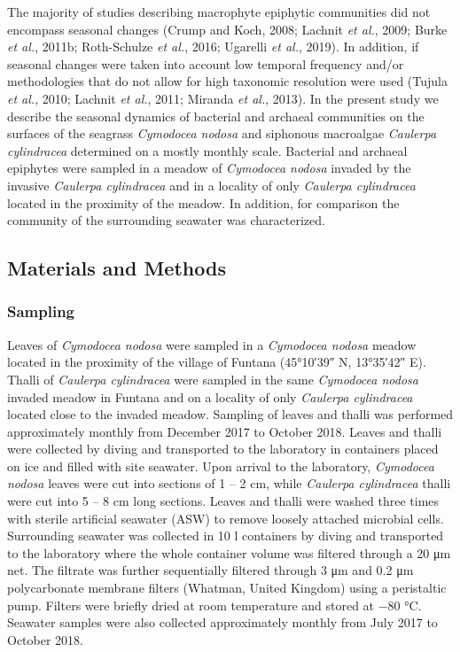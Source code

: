 \documentclass[12pt,]{article}
\begin{document}
The majority of studies describing macrophyte epiphytic communities did
not encompass seasonal changes (Crump and Koch, 2008; Lachnit \emph{et
al.}, 2009; Burke \emph{et al.}, 2011b; Roth-Schulze \emph{et al.},
2016; Ugarelli \emph{et al.}, 2019). In addition, if seasonal changes
were taken into account low temporal frequency and/or methodologies that
do not allow for high taxonomic resolution were used (Tujula \emph{et
al.}, 2010; Lachnit \emph{et al.}, 2011; Miranda \emph{et al.}, 2013).
In the present study we describe the seasonal dynamics of bacterial and
archaeal communities on the surfaces of the seagrass \emph{Cymodocea
nodosa} and siphonous macroalgae \emph{Caulerpa cylindracea} determined
on a mostly monthly scale. Bacterial and archaeal epiphytes were sampled
in a meadow of \emph{Cymodocea nodosa} invaded by the invasive
\emph{Caulerpa cylindracea} and in a locality of only \emph{Caulerpa
cylindracea} located in the proximity of the meadow. In addition, for
comparison the community of the surrounding seawater was characterized.

\newpage

\hypertarget{materials-and-methods}{%
\subsection{Materials and Methods}\label{materials-and-methods}}

\hypertarget{sampling}{%
\subsubsection{Sampling}\label{sampling}}

Leaves of \emph{Cymodocea nodosa} were sampled in a \emph{Cymodocea
nodosa} meadow located in the proximity of the village of Funtana
(\ang{45;10;39} N, \ang{13;35;42} E). Thalli of \emph{Caulerpa
cylindracea} were sampled in the same \emph{Cymodocea nodosa} invaded
meadow in Funtana and on a locality of only \emph{Caulerpa cylindracea}
located close to the invaded meadow. Sampling of leaves and thalli was
performed approximately monthly from December 2017 to October 2018.
Leaves and thalli were collected by diving and transported to the
laboratory in containers placed on ice and filled with site seawater.
Upon arrival to the laboratory, \emph{Cymodocea nodosa} leaves were cut
into sections of 1 -- 2 \si{\cm}, while \emph{Caulerpa cylindracea}
thalli were cut into 5 -- 8 \si{\cm} long sections. Leaves and thalli
were washed three times with sterile artificial seawater (ASW) to remove
loosely attached microbial cells. Surrounding seawater was collected in
10 \si{\l} containers by diving and transported to the laboratory where
the whole container volume was filtered through a 20 \si{\um} net. The
filtrate was further sequentially filtered through 3 \si{\um} and 0.2
\si{\um} polycarbonate membrane filters (Whatman, United Kingdom) using
a peristaltic pump. Filters were briefly dried at room temperature and
stored at \num{-80} \si{\degreeCelsius}. Seawater samples were also
collected approximately monthly from July 2017 to October 2018.
\end{document}
